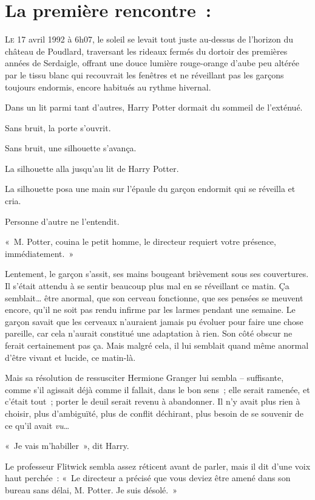 
\section{La première rencontre~:}

\lettrine{L}{e} 17 avril 1992 à 6h07, le soleil se levait tout juste au-dessus de l'horizon du château de Poudlard, traversant les rideaux fermés du dortoir des premières années de Serdaigle, offrant une douce lumière rouge-orange d'aube peu altérée par le tissu blanc qui recouvrait les fenêtres et ne réveillant pas les garçons toujours endormis, encore habitués au rythme hivernal.

Dans un lit parmi tant d'autres, Harry Potter dormait du sommeil de l'exténué.

Sans bruit, la porte s'ouvrit.

Sans bruit, une silhouette s'avança.

La silhouette alla jusqu'au lit de Harry Potter.

La silhouette posa une main sur l'épaule du garçon endormit qui se réveilla et cria.

Personne d'autre ne l'entendit.

«~M. Potter, couina le petit homme, le directeur requiert votre présence, immédiatement.~»

Lentement, le garçon s'assit, ses mains bougeant brièvement sous ses couvertures. Il s'était attendu à se sentir beaucoup plus mal en se réveillant ce matin. Ça semblait… être anormal, que son cerveau fonctionne, que ses pensées se meuvent encore, qu'il ne soit pas rendu infirme par les larmes pendant une semaine. Le garçon savait que les cerveaux n'auraient jamais pu évoluer pour faire une chose pareille, car cela n'aurait constitué une adaptation à rien. Son côté obscur ne ferait certainement pas ça. Mais malgré cela, il lui semblait quand même anormal d'être vivant et lucide, ce matin-là.

Mais sa résolution de ressusciter Hermione Granger lui sembla -- suffisante, comme s'il agissait déjà comme il fallait, dans le bon sens~; elle serait ramenée, et c'était tout~; porter le deuil serait revenu à abandonner. Il n'y avait plus rien à choisir, plus d'ambiguïté, plus de conflit déchirant, plus besoin de se souvenir de ce qu'il avait \emph{vu}…

«~Je vais m'habiller~», dit Harry.

Le professeur Flitwick sembla assez réticent avant de parler, mais il dit d'une voix haut perchée~: «~Le directeur a précisé que vous deviez être amené dans son bureau sans délai, M. Potter. Je suis désolé.~»

